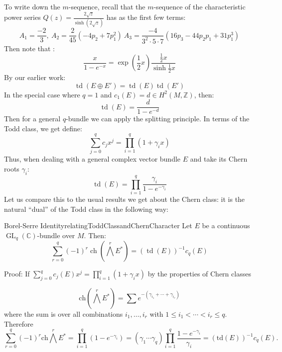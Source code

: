 \documentclass{book}
\newenvironment{Proof}[1][]
  {\begin{ProofTcb}[#1]}
  {\end{ProofTcb}}
\newcommand{\Z}{{\mathbb{Z}}}
\newcommand{\C}{{\mathbb{C}}}
\newcommand{\ch}{{\operatorname{ch}}}
\newcommand{\GL}{{\operatorname{GL}}}
\newcommand{\td}{{\operatorname{td}}}
\renewcommand{\ch}{{\operatorname{ch}}}
\begin{document}
To write down the $m$-sequence, recall that the $m$-sequence of the
characteristic power series $Q(z) = \frac{2\sqrt{z}}{\sinh(2\sqrt{z})}$ has as the first few terms:
\[
  A_1 = \frac{-2}{3},\ A_2 = \frac{2}{45} (-4p_2 + 7p_1^2)\ A_3 = \frac{-4}{3^2\cdot 5\cdot 7} \left(16p_3
  - 44p_2p_1 + 31 p_1^3\right)
\]
Then note that :
\[
  \frac{x}{1-e^{-x}} = \exp \left(\frac{1}{2}x\right) \frac{\frac{1}{2}x}{\sinh \frac{1}{2}x}
\]
By our earlier work:
\[
  \td(E\oplus E') = \td(E)\td(E')
\]
In the special case where $q= 1$ and $c_1(E) = d \in H^2(M, \Z)$, then:
\[
  \td(E) = \frac{d}{1-e^{-d}}
\]
Then for a general $q$-bundle we can apply the splitting principle. In terms of the Todd class, we get
define:
\[
  \sum_{j=0}^q c_jx^j = \prod_{i=1}^q (1 + \gamma_ix)
\]
Thus, when dealing with a general complex vector bundle $E$ and take its Chern roots $\gamma_i$:
\[
  \td(E) = \prod_{i=1}^q \frac{\gamma_i}{1-e^{-\gamma_i}}
\]
Let us compare this to the usual results we get about the Chern class: it is the natural ``dual'' of the Todd
class in the following way:
\begin{thm}{Borel-Serre Identity}{relatingToddClassandChernCharacter}
  Let $E$ be a continuous $\GL_q(\C)$-bundle over $M$. Then:
  \[
    \sum_{r=0}^q (-1)^r \ch \left(\bigwedge^rE^*\right) = (\td(E))^{-1}c_q(E)
  \]
\end{thm}

\begin{Proof}
  Proof: If $\sum_{j=0}^q c_j(E) x^j = \prod_{i=1}^q (1 + \gamma_i x)$ by the properties of Chern classes

\[
    \text{ch}\left(\bigwedge^r E^*\right) = \sum e^{-(\gamma_{i_1} + \cdots + \gamma_{i_r})}
\]
where the sum is over all combinations $i_1, \ldots, i_r$ with $1 \leq i_1 < \cdots < i_r \leq q$. Therefore
\[
    \sum_{r=0}^q (-1)^r \text{ch}\bigwedge^r E^* = \prod_{i=1}^q (1-e^{-\gamma_i}) = (\gamma_1 \cdots \gamma_q) \prod_{i=1}^q \frac{1-e^{-\gamma_i}}{\gamma_i} = (\text{td}(E))^{-1} c_q(E).
\]
\end{Proof}

\end{document}
